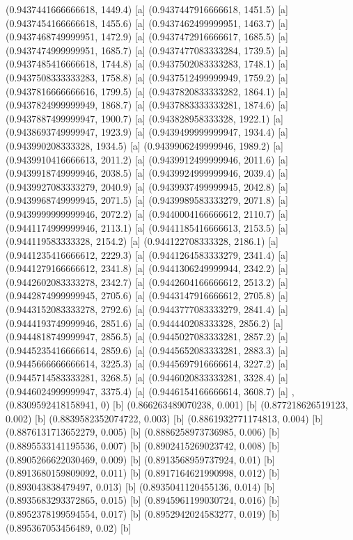 {{{(0.9437441666666618, 1449.4) [a] 
(0.9437447916666618, 1451.5) [a] 
(0.9437454166666618, 1455.6) [a] 
(0.9437462499999951, 1463.7) [a] 
(0.9437468749999951, 1472.9) [a] 
(0.9437472916666617, 1685.5) [a] 
(0.9437474999999951, 1685.7) [a] 
(0.9437477083333284, 1739.5) [a] 
(0.9437485416666618, 1744.8) [a] 
(0.9437502083333283, 1748.1) [a] 
(0.9437508333333283, 1758.8) [a] 
(0.9437512499999949, 1759.2) [a] 
(0.9437816666666616, 1799.5) [a] 
(0.9437820833333282, 1864.1) [a] 
(0.9437824999999949, 1868.7) [a] 
(0.9437883333333281, 1874.6) [a] 
(0.9437887499999947, 1900.7) [a] 
(0.943828958333328, 1922.1) [a] 
(0.9438693749999947, 1923.9) [a] 
(0.9439499999999947, 1934.4) [a] 
(0.943990208333328, 1934.5) [a] 
(0.9439906249999946, 1989.2) [a] 
(0.9439910416666613, 2011.2) [a] 
(0.9439912499999946, 2011.6) [a] 
(0.9439918749999946, 2038.5) [a] 
(0.9439924999999946, 2039.4) [a] 
(0.9439927083333279, 2040.9) [a] 
(0.9439937499999945, 2042.8) [a] 
(0.9439968749999945, 2071.5) [a] 
(0.9439989583333279, 2071.8) [a] 
(0.9439999999999946, 2072.2) [a] 
(0.9440004166666612, 2110.7) [a] 
(0.9441174999999946, 2113.1) [a] 
(0.9441185416666613, 2153.5) [a] 
(0.944119583333328, 2154.2) [a] 
(0.944122708333328, 2186.1) [a] 
(0.9441235416666612, 2229.3) [a] 
(0.9441264583333279, 2341.4) [a] 
(0.9441279166666612, 2341.8) [a] 
(0.9441306249999944, 2342.2) [a] 
(0.9442602083333278, 2342.7) [a] 
(0.9442604166666612, 2513.2) [a] 
(0.9442874999999945, 2705.6) [a] 
(0.9443147916666612, 2705.8) [a] 
(0.9443152083333278, 2792.6) [a] 
(0.9443777083333279, 2841.4) [a] 
(0.9444193749999946, 2851.6) [a] 
(0.944440208333328, 2856.2) [a] 
(0.9444818749999947, 2856.5) [a] 
(0.9445027083333281, 2857.2) [a] 
(0.9445235416666614, 2859.6) [a] 
(0.9445652083333281, 2883.3) [a] 
(0.9445666666666614, 3225.3) [a] 
(0.9445697916666614, 3227.2) [a] 
(0.9445714583333281, 3268.5) [a] 
(0.9446020833333281, 3328.4) [a] 
(0.9446024999999947, 3375.4) [a] 
(0.9446154166666614, 3608.7) [a] 
},{(0.8309592418158941, 0) [b] 
(0.866263489070238, 0.001) [b] 
(0.877218626519123, 0.002) [b] 
(0.8839582352074722, 0.003) [b] 
(0.8861932771174813, 0.004) [b] 
(0.8876131713652279, 0.005) [b] 
(0.8886258973736985, 0.006) [b] 
(0.8895533141195536, 0.007) [b] 
(0.8902415269023742, 0.008) [b] 
(0.8905266622030469, 0.009) [b] 
(0.8913568959737924, 0.01) [b] 
(0.8913680159809092, 0.011) [b] 
(0.8917164621990998, 0.012) [b] 
(0.893043838479497, 0.013) [b] 
(0.8935041120455136, 0.014) [b] 
(0.8935683293372865, 0.015) [b] 
(0.8945961199030724, 0.016) [b] 
(0.8952378199594554, 0.017) [b] 
(0.8952942024583277, 0.019) [b] 
(0.895367053456489, 0.02) [b] 
}}}
